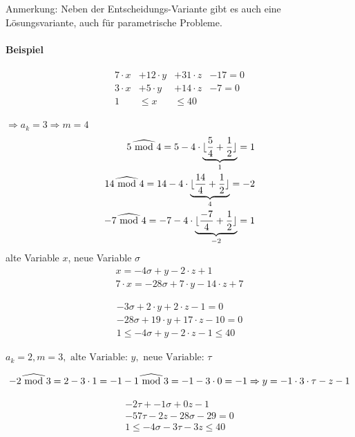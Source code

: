 Anmerkung: Neben der Entscheidungs-Variante gibt es auch eine
Lösungsvariante, auch für parametrische Probleme.

\paragraph{Beispiel}

\begin{align}
7 \cdot x &+ 12 \cdot y &+ 31 \cdot z  &-17 = 0\\
3 \cdot x &+ 5 \cdot y &+ 14 \cdot z &- 7 = 0\\
1 &\leq x &\leq 40
\end{align}

\( \Rightarrow a_k = 3 \Rightarrow m = 4\) \\
\[
\begin{split}
 5 \widehat{\textrm{\ mod\ }} 4 = 5-4 \cdot \underbrace{\lfloor \frac{5}{4} + \frac{1}{2} \rfloor}_{1} = 1 \\
  14 \widehat{\textrm{\ mod\ }} 4 = 14-4 \cdot \underbrace{\lfloor \frac{14}{4} + \frac{1}{2} \rfloor}_{4} = -2 \\
   -7 \widehat{\textrm{\ mod\ }} 4 = -7-4 \cdot \underbrace{ \lfloor \frac{-7}{4} + \frac{1}{2} \rfloor }_{-2}= 1
\end{split}
\]
alte Variable \(x\), neue Variable \( \sigma \) \\

\[
\begin{split}
 x = -4 \sigma + y - 2 \cdot z + 1 \\
  7\cdot x = -28 \sigma + 7 \cdot y - 14 \cdot z + 7
\end{split}
\]

\begin{align}
 -3 \sigma +2 \cdot y + 2  \cdot z -1 = 0 \\
 -28 \sigma + 19 \cdot y + 17 \cdot z - 10 = 0 \\
 1 \leq - 4 \sigma + y - 2 \cdot z - 1 \leq 40
\end{align}

\( a_k = 2, m=3, \text{ alte Variable: } y, \text{ neue Variable: } \tau \)

\[
-2 \widehat{\textrm{\ mod\ }} 3 = 2 - 3 \cdot 1 = -1 \\
-1 \widehat{\textrm{\ mod\ }} 3 = -1 -3 \cdot 0 = -1 \\
\Rightarrow y = -1 \cdot 3 \cdot \tau - z - 1
\]

\begin{align}
-2 \tau + -1 \sigma + 0 z - 1\\
-57 \tau - 2 z - 28 \sigma - 29 = 0 \\
1 \leq -4 \sigma - 3 \tau - 3 z \leq 40
\end{align}

